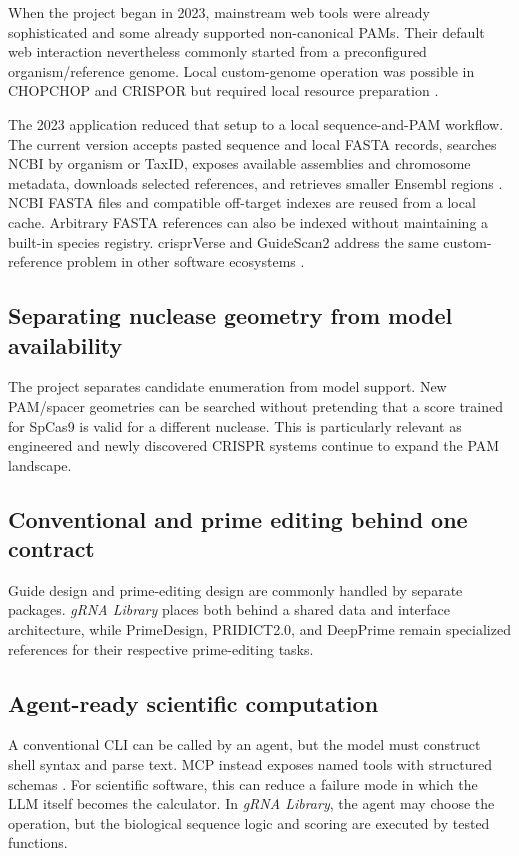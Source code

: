 \documentclass[11pt]{article}
\newcommand{\grnalib}{\textit{gRNA Library}}
\begin{document}
When the project began in 2023, mainstream web tools were already sophisticated and some already supported non-canonical PAMs. Their default web interaction nevertheless commonly started from a preconfigured organism/reference genome. Local custom-genome operation was possible in CHOPCHOP and CRISPOR but required local resource preparation \citep{crisporManual,chopchopInstructions}.

The 2023 application reduced that setup to a local sequence-and-PAM workflow. The current version accepts pasted sequence and local FASTA records, searches NCBI by organism or TaxID, exposes available assemblies and chromosome metadata, downloads selected references, and retrieves smaller Ensembl regions \citep{ncbiDatasets2026,ensemblRest2026}. NCBI FASTA files and compatible off-target indexes are reused from a local cache. Arbitrary FASTA references can also be indexed without maintaining a built-in species registry. crisprVerse and GuideScan2 address the same custom-reference problem in other software ecosystems \citep{hoberecht2022crisprverse,schmidt2025guidescan2}.

\subsection{Separating nuclease geometry from model availability}

The project separates candidate enumeration from model support. New PAM/spacer geometries can be searched without pretending that a score trained for SpCas9 is valid for a different nuclease. This is particularly relevant as engineered and newly discovered CRISPR systems continue to expand the PAM landscape.

\subsection{Conventional and prime editing behind one contract}

Guide design and prime-editing design are commonly handled by separate packages. \grnalib{} places both behind a shared data and interface architecture, while PrimeDesign, PRIDICT2.0, and DeepPrime remain specialized references for their respective prime-editing tasks.

\subsection{Agent-ready scientific computation}

A conventional CLI can be called by an agent, but the model must construct shell syntax and parse text. MCP instead exposes named tools with structured schemas \citep{mcp2026tools}. For scientific software, this can reduce a failure mode in which the LLM itself becomes the calculator. In \grnalib{}, the agent may choose the operation, but the biological sequence logic and scoring are executed by tested functions.
\end{document}
